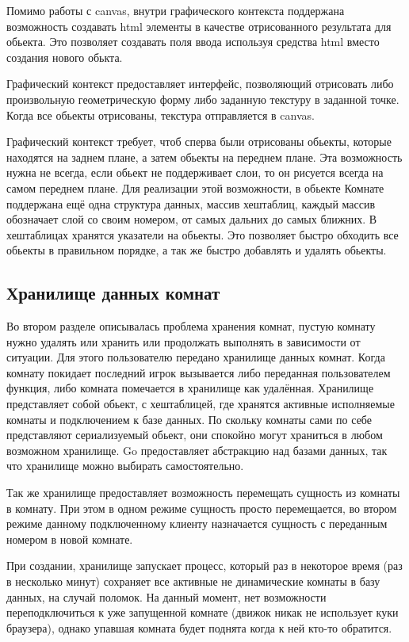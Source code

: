\documentclass[a4paper,14pt, openany]{book}
\begin{document}
Помимо работы с canvas, внутри графического контекста поддержана возможность создавать html элементы в качестве отрисованного результата для обьекта. Это позволяет создавать поля ввода используя средства html вместо создания нового обькта. 

Графический контекст предоставляет интерфейс, позволяющий отрисовать либо произвольную геометрическую форму либо заданную текстуру в заданной точке. Когда все обьекты отрисованы, текстура отправляется в canvas.

Графический контекст требует, чтоб сперва были отрисованы обьекты, которые находятся на заднем плане, а затем обьекты на переднем плане. Эта возможность нужна не всегда, если обьект не поддерживает слои, то он рисуется всегда на самом переднем плане. Для реализации этой возможности, в обьекте Комнате поддержана ещё одна структура данных, массив хештаблиц, каждый массив обозначает слой со своим номером, от самых дальних до самых ближних. В хештаблицах хранятся указатели на обьекты. Это позволяет быстро обходить все обьекты в правильном порядке, а так же быстро добавлять и удалять обьекты.

\subsection{Хранилище данных комнат}

Во втором разделе описывалась проблема хранения комнат, пустую комнату нужно удалять или хранить или продолжать выполнять в зависимости от ситуации. Для этого пользователю передано хранилище данных комнат. Когда комнату покидает последний игрок вызывается либо переданная пользователем функция, либо комната помечается в хранилище как удалённая. Хранилище представляет собой обьект, с хештаблицей, где хранятся активные исполняемые комнаты и подключением к базе данных. По скольку комнаты сами по себе представляют сериализуемый обьект, они спокойно могут храниться в любом возможном хранилище. Go предоставляет абстракцию над базами данных, так что хранилище можно выбирать самостоятельно.

Так же хранилище предоставляет возможность перемещать сущность из комнаты в комнату. При этом в одном режиме сущность просто перемещается, во втором режиме данному подключенному клиенту назначается сущность с
переданным номером в новой комнате.

При создании, хранилище запускает процесс, который раз в некоторое время (раз в несколько минут) сохраняет все активные не динамические комнаты в базу данных, на случай поломок. На данный момент, нет возможности переподключиться к уже запущенной комнате (движок никак не использует куки браузера), однако упавшая комната будет поднята когда к ней кто-то обратится.
\end{document}
